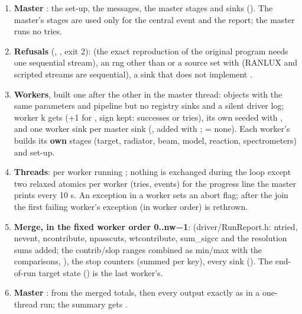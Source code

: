 \begin{enumerate}
\item \textbf{Master} : the set-up, the messages, the master stages and sinks (). The master's stages
are used only for the central event and the report; the master runs no tries.
\item \textbf{Refusals} (, ,  exit 2):  (the exact
reproduction of the original program needs one sequential stream), an rng other than  or a source set with 
(RANLUX and scripted streams are sequential),\allowbreak{} a sink that does not implement .
\item \textbf{Workers}, built one after the other in the master thread:   objects with the same
parameters and pipeline but no registry sinks and a silent driver log; worker k gets  (+1 for
, sign kept: successes or tries), its own  seeded with , and one
worker sink per master sink (, added with ;  = none). Each worker's
 builds its \textbf{own} stages (target, radiator, beam, model, reaction, spectrometers) and set-up.
\item \textbf{Threads}:  per worker running ; nothing is exchanged during the loop except
two relaxed atomics per worker (tries, events) for the progress line the master prints every 10 s. An exception in a
worker sets an abort flag; after the join the first failing worker's exception (in worker order) is rethrown.
\item \textbf{Merge, in the fixed worker order 0..nw−1}:  (driver/\allowbreak{}RunReport.\allowbreak{}h: ntried, nevent, ncontribute,\allowbreak{}
npasscuts, wtcontribute,\allowbreak{} sum\_sigcc and the resolution sums added; the contrib/\allowbreak{}slop ranges combined as min/max with the
 comparisons,\allowbreak{} ), the stop counters (summed per key), every sink
(). The end-of-run target state () is the last worker's.
\item \textbf{Master} :  from the merged totals, then every output exactly as
in a one-thread run; the summary gets .
\end{enumerate}
